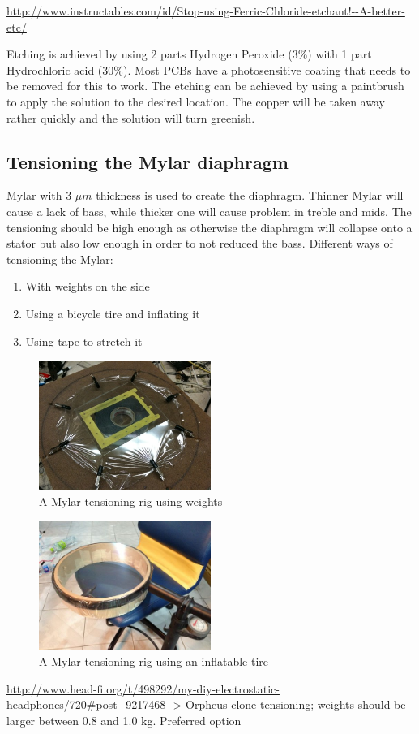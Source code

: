\documentclass{article}
\begin{document}
\url{http://www.instructables.com/id/Stop-using-Ferric-Chloride-etchant!--A-better-etc/}

Etching is achieved by using 2 parts Hydrogen Peroxide (3\%) with 1 part Hydrochloric acid (30\%). Most PCBs have a photosensitive coating that needs to be removed for this to work. The etching can be achieved by using a paintbrush to apply the solution to the desired location. The copper will be taken away rather quickly and the solution will turn greenish.

\subsection{Tensioning the Mylar diaphragm}
\label{s:driver:tension}
Mylar with 3 $\mu m$ thickness is used to create the diaphragm. Thinner Mylar will cause a lack of bass, while thicker one will cause problem in treble and mids. The tensioning should be high enough as otherwise the diaphragm will collapse onto a stator but also low enough in order to not reduced the bass.
Different ways of tensioning the Mylar:
\begin{enumerate}
    \item With weights on the side
    \item Using a bicycle tire and inflating it
    \item Using tape to stretch it
\end{enumerate}
\begin{figure}[htb]
    \centering
    \includegraphics[width=0.5\textwidth]{images/mylar-tension-weight.png}
    \caption{A Mylar tensioning rig using weights}
    \label{f:driver:tension:weight}
\end{figure}
\begin{figure}[htb]
    \centering
    \includegraphics[width=0.5\textwidth]{images/mylar-tension-tire.png}
    \caption{A Mylar tensioning rig using an inflatable tire}
    \label{f:driver:tension:tire}
\end{figure}
\url{http://www.head-fi.org/t/498292/my-diy-electrostatic-headphones/720#post_9217468} -> Orpheus clone tensioning; weights should be larger between 0.8 and 1.0 kg. Preferred option
\end{document}
